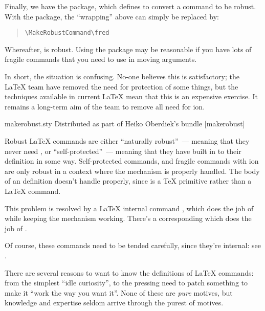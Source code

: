 Finally, we have the  package, which  defines
 to convert a command to be robust.  With the
package, the ``wrapping'' above can simply be replaced by:
\begin{quote}
\begin{verbatim}
\MakeRobustCommand\fred
\end{verbatim}
\end{quote}
Whereafter,  is robust.  Using the package may be reasonable
if you have lots of fragile commands that you need to use in moving
arguments.

In short, the situation is confusing.  No-one believes this is
satisfactory; the \LaTeX{} team have removed the need for
protection of some things, but the techniques available in 
current \LaTeX{} mean that this is an expensive exercise.  It remains
a long-term aim of the team to remove all need for ion.
\begin{ctanrefs}
\item[makerobust.sty]Distributed as part of Heiko Oberdiek's bundle
  [makerobust]
\end{ctanrefs}


Robust \LaTeX{} commands are either ``naturally robust''~--- meaning that
they never need , or ``self-protected''~--- meaning that
they have  built in to their definition in some
way.  Self-protected commands, and fragile commands with
ion are only robust in a context where the 
mechanism is properly handled.  The body of an  definition
doesn't handle  properly, since  is a \TeX{}
primitive rather than a \LaTeX{} command.

This problem is resolved by a \LaTeX{} internal command
, which does the job of  while keeping the
 mechanism working.  There's a corresponding
 which does the job of .

Of course, these commands need to be tended carefully, since they're
internal: see .


There are several reasons to want to know the definitions of \LaTeX{}
commands: from the simplest ``idle curiosity'', to the pressing need
to patch something to make it ``work the way you want it''.  None of
these are \emph{pure} motives, but knowledge and expertise seldom
arrive through the purest of motives.

